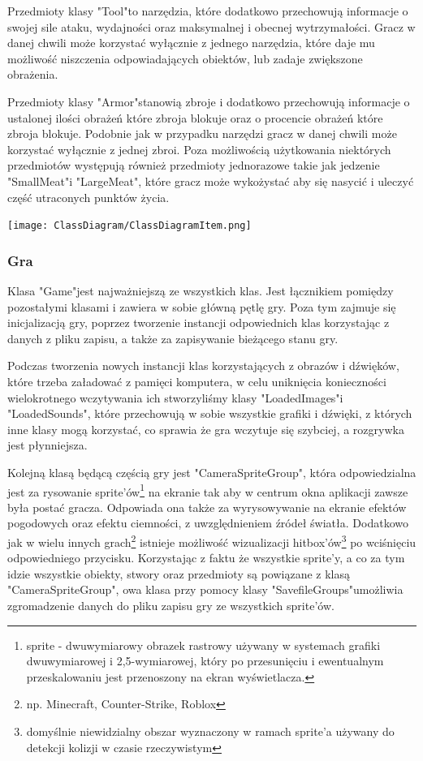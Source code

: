 \documentclass{article}
\begin{document}
Przedmioty klasy "Tool"\space to narzędzia, które dodatkowo przechowują informacje o swojej sile ataku, wydajności oraz maksymalnej i obecnej wytrzymałości. Gracz w danej chwili może korzystać wyłącznie z jednego narzędzia, które daje mu możliwość niszczenia odpowiadających obiektów, lub zadaje zwiększone obrażenia.

Przedmioty klasy "Armor"\space stanowią zbroje i dodatkowo przechowują informacje o ustalonej ilości obrażeń które zbroja blokuje oraz o procencie obrażeń które zbroja blokuje. Podobnie jak w przypadku narzędzi gracz w danej chwili może korzystać wyłącznie z jednej zbroi. Poza możliwością użytkowania niektórych przedmiotów występują również przedmioty jednorazowe takie jak jedzenie "SmallMeat"\space i "LargeMeat", które gracz może wykożystać aby się nasycić i uleczyć część utraconych punktów życia.

\begin{center}
     \texttt{[image: ClassDiagram/ClassDiagramItem.png]}
\end{center}

\subsubsection{Gra}
Klasa "Game"\space jest najważniejszą ze wszystkich klas. Jest łącznikiem pomiędzy pozostałymi klasami i zawiera w sobie główną pętlę gry. Poza tym zajmuje się inicjalizacją gry, poprzez tworzenie instancji odpowiednich klas korzystając z danych z pliku zapisu, a także za zapisywanie bieżącego stanu gry.

Podczas tworzenia nowych instancji klas korzystających z obrazów i dźwięków, które trzeba załadować z pamięci komputera, w celu uniknięcia konieczności wielokrotnego wczytywania ich stworzyliśmy klasy "LoadedImages"\space i "LoadedSounds", które przechowują w sobie wszystkie grafiki i dźwięki, z których inne klasy mogą korzystać, co sprawia że gra wczytuje się szybciej, a rozgrywka jest płynniejsza.

Kolejną klasą będącą częścią gry jest "CameraSpriteGroup", która odpowiedzialna jest za rysowanie sprite'ów\footnote{sprite - dwuwymiarowy obrazek rastrowy używany w systemach grafiki dwuwymiarowej i 2,5-wymiarowej, który po przesunięciu i ewentualnym przeskalowaniu jest przenoszony na ekran wyświetlacza.\cite{wiki:sprite}} na ekranie tak aby w centrum okna aplikacji zawsze była postać gracza. Odpowiada ona także za wyrysowywanie na ekranie efektów pogodowych oraz efektu ciemności, z uwzględnieniem źródeł światła. Dodatkowo jak w wielu innych grach\footnote{np. Minecraft, Counter-Strike, Roblox} istnieje możliwość wizualizacji hitbox'ów\footnote{domyślnie niewidzialny obszar wyznaczony w ramach sprite'a używany do detekcji kolizji w czasie rzeczywistym\cite{wiki:hitbox}} po wciśnięciu odpowiedniego przycisku. Korzystając z faktu że wszystkie sprite'y, a co za tym idzie wszystkie obiekty, stwory oraz przedmioty są powiązane z klasą "CameraSpriteGroup", owa klasa przy pomocy klasy "SavefileGroups"\space umożliwia zgromadzenie danych do pliku zapisu gry ze wszystkich sprite'ów.
\end{document}
